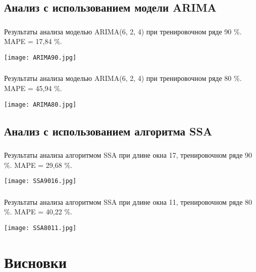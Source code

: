 \documentclass[c]{beamer}
\begin{document}
\subsection{Анализ с использованием модели ARIMA}

\begin{frame}
	\frametitle{\insertsection}
	\framesubtitle{\insertsubsection}

	Результаты анализа моделью ARIMA(6, 2, 4) при тренировочном ряде 90 \%. MAPE = 17,84 \%.
		
  	\texttt{[image: ARIMA90.jpg]}


\end{frame}

\begin{frame}
	\frametitle{\insertsection}
	\framesubtitle{\insertsubsection}
	
	Результаты анализа моделью ARIMA(6, 2, 4) при тренировочном ряде 80 \%. MAPE = 45,94 \%.
	
	\texttt{[image: ARIMA80.jpg]}


\end{frame}

\subsection{Анализ с использованием алгоритма SSA}

\begin{frame}
	\frametitle{\insertsection}
	\framesubtitle{\insertsubsection}

	Результаты анализа алгоритмом SSA при длине окна 17, тренировочном ряде 90 \%. MAPE = 29,68 \%.
	
  	\texttt{[image: SSA9016.jpg]}

\end{frame}

\begin{frame}
	\frametitle{\insertsection}
	\framesubtitle{\insertsubsection}

	Результаты анализа алгоритмом SSA при длине окна 11, тренировочном ряде 80 \%. MAPE = 40,22 \%.

	\texttt{[image: SSA8011.jpg]}

\end{frame}

\section{Висновки}
\end{document}
